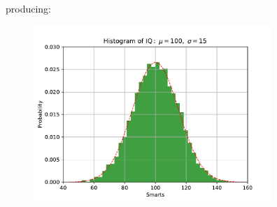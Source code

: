 \documentclass[10pt,a4paper]{article}
\begin{document}
producing:
\begin{figure}[h]
\centering
\includegraphics[width=9cm]{hist.pdf}
\end{figure}
\end{document}
